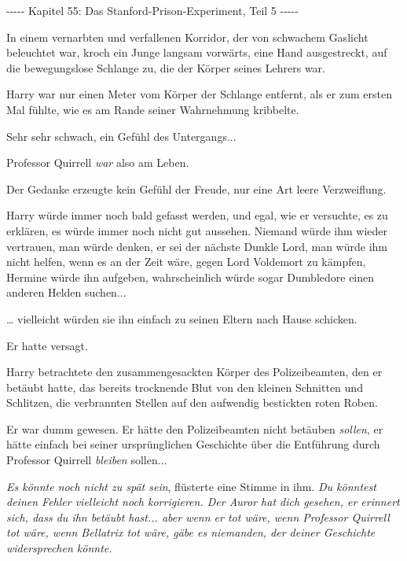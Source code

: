 

\hypertarget{das-stanford-prison-experiment-teil-5}{%

-\/-\/-\/-\/- Kapitel 55: Das Stanford-Prison-Experiment, Teil 5 -\/-\/-\/-\/-

In einem vernarbten und verfallenen Korridor, der von schwachem Gaslicht beleuchtet war, kroch ein Junge langsam vorwärts, eine Hand ausgestreckt, auf die bewegungslose Schlange zu, die der Körper seines Lehrers war.

Harry war nur einen Meter vom Körper der Schlange entfernt, als er zum ersten Mal fühlte, wie es am Rande seiner Wahrnehmung kribbelte.

Sehr sehr schwach, ein Gefühl des Untergangs...

Professor Quirrell \emph{war} also am Leben.

Der Gedanke erzeugte kein Gefühl der Freude, nur eine Art leere Verzweiflung.

Harry würde immer noch bald gefasst werden, und egal, wie er versuchte, es zu erklären, es würde immer noch nicht gut aussehen. Niemand würde ihm wieder vertrauen, man würde denken, er sei der nächste Dunkle Lord, man würde ihm nicht helfen, wenn es an der Zeit wäre, gegen Lord Voldemort zu kämpfen, Hermine würde ihn aufgeben, wahrscheinlich würde sogar Dumbledore einen anderen Helden suchen...

… vielleicht würden sie ihn einfach zu seinen Eltern nach Hause schicken.

Er hatte versagt.

Harry betrachtete den zusammengesackten Körper des Polizeibeamten, den er betäubt hatte, das bereits trocknende Blut von den kleinen Schnitten und Schlitzen, die verbrannten Stellen auf den aufwendig bestickten roten Roben.

Er war dumm gewesen. Er hätte den Polizeibeamten nicht betäuben \emph{sollen}, er hätte einfach bei seiner ursprünglichen Geschichte über die Entführung durch Professor Quirrell \emph{bleiben} sollen...

\emph{Es könnte noch nicht zu spät sein}, flüsterte eine Stimme in ihm. \emph{Du könntest deinen Fehler vielleicht noch korrigieren. Der Auror hat dich gesehen, er erinnert sich, dass du ihn betäubt hast... aber wenn er tot wäre, wenn Professor Quirrell tot wäre, wenn Bellatrix tot wäre, gäbe es niemanden, der deiner Geschichte widersprechen könnte.}

}
